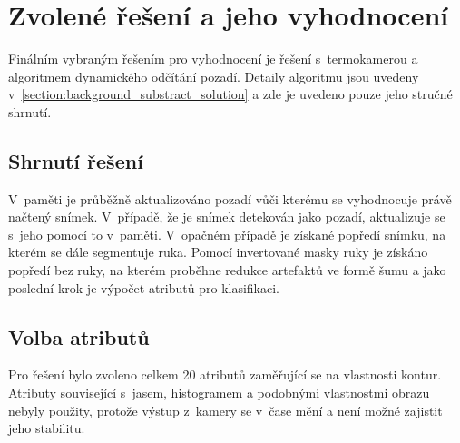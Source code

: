 \chapter{Zvolené řešení a jeho vyhodnocení}\label{chapter:choosen_solution}
Finálním vybraným řešením pro vyhodnocení je řešení s~termokamerou a algoritmem dynamického odčítání pozadí. Detaily algoritmu jsou uvedeny v~\ref{section:background_substract_solution} a zde je uvedeno pouze jeho stručné shrnutí. 

\section{Shrnutí řešení}
V~paměti je průběžně aktualizováno pozadí vůči kterému se vyhodnocuje právě načtený snímek. V~případě, že je snímek detekován jako pozadí, aktualizuje se s~jeho pomocí to v~paměti. V~opačném případě je získané popředí snímku, na kterém se dále segmentuje ruka. Pomocí invertované masky ruky je získáno popředí bez ruky, na kterém proběhne redukce artefaktů ve formě šumu a jako poslední krok je výpočet atributů pro klasifikaci.

\section{Volba atributů}\label{section:attributes}
Pro řešení bylo zvoleno celkem 20 atributů zaměřující se na vlastnosti kontur. Atributy související s~jasem, histogramem a podobnými vlastnostmi obrazu nebyly použity, protože výstup z~kamery se v~čase mění a není možné zajistit jeho stabilitu.

